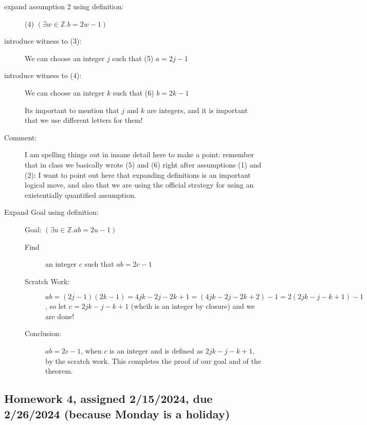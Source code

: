 \documentclass[12pt]{article}
\begin{document}
\begin{description}
\begin{description}
\item [expand assumption 2 using definition:]  (4) $(\exists w\in \mathbb Z.b=2w-1)$

\item [introduce witness to (3):]  We can choose an integer  $j$ such that (5) $a=2j-1$

\item [introduce witness to (4):]  We can choose an integer $k$ such that (6) $b=2k-1$

Its important to mention that $j$ and $k$ are integers, and it is important that we use different letters for them!

\item[Comment:] I am spelling things out in insane detail here to make
a point: remember that in class we basically wrote (5) and (6) right
after assumptions (1) and (2): I want to point out here that expanding
definitions is an important logical move, and also that we are using
the official strategy for using an existentially quantified
assumption.

\item [Expand Goal using definition:]  Goal: $(\exists u\in \mathbb Z.ab=2u-1)$
\begin{description}
\item [Find] an integer $c$ such that $ab=2c-1$

\item[Scratch Work:] $ab = (2j-1)(2k-1) = 4jk -2j-2k+1 = (4jk-2j-2k+2)-1 = 2(2jk - j -k+1)-1$, so let $c=2jk-j-k+1$ (whcih is an integer by closure) and we are done!

\item[Conclusion:]  $ab=2c-1$, when $c$ is an integer and is defined as $2jk-j-k+1$, by the scratch work.  This completes the proof of our goal and of the theorem.
\end{description}


\end{description}



\end{description}


\subsection{Homework 4, assigned 2/15/2024, due 2/26/2024 (because Monday is a holiday)}
\end{document}
